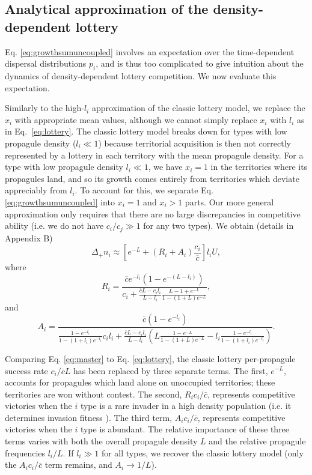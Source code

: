 \documentclass[11pt]{article}
\begin{document}
\subsection*{Analytical approximation of the density-dependent lottery}

Eq. \eqref{eq:growthsumuncoupled} involves an expectation over the time-dependent dispersal distributions $p_i$, and is thus too complicated to give intuition about the dynamics of density-dependent lottery competition. We now evaluate this expectation. 

Similarly to the high-$l_i$ approximation of the classic lottery model, we replace the $x_i$ with appropriate mean values, although we cannot simply replace $x_i$ with $l_i$ as in Eq.~\eqref{eq:lottery}. The classic lottery model breaks down for types with low propagule density ($l_i\ll 1$) because territorial acquisition is then not correctly represented by a lottery in each territory with the mean propagule density. For a type with low propagule density $l_i\ll 1$, we have $x_i=1$ in the territories where its propagules land, and so its growth comes entirely from territories which deviate appreciably from $l_i$. To account for this, we separate Eq. \eqref{eq:growthsumuncoupled} into $x_i=1$ and $x_i>1$ parts. Our more general approximation only requires that there are no large discrepancies in competitive ability (i.e. we do not have $c_i/c_j\gg 1$ for any two types). We obtain (details in Appendix B)
\begin{equation}
\Delta_+ n_i\approx \left[e^{-L}+(R_i+A_i)\frac{c_i}{\overline{c}}\right]l_i U, \label{eq:master}
\end{equation}
where
\begin{equation}
R_i=\frac{\overline{c}e^{-l_i}(1-e^{-(L-l_i)})}{c_i +\frac{\overline{c}L- c_il_i}{L-l_i}\frac{L-1+e^{-L}}{1-(1+L)e^{-L}}},\nonumber \label{eq:Dr}
\end{equation}
and
\begin{equation}
A_i=\frac{\overline{c}(1-e^{-l_i})}{\frac{1-e^{-l_i}}{1-(1+l_i)e^{-l_i}}c_il_i+\frac{\overline{c}L- c_il_i}{L-l_i}\left(L\frac{1-e^{-L}}{1-(1+L)e^{-L}}-l_i\frac{1-e^{-l_i}}{1-(1+l_i)e^{-l_i}}\right)}. \nonumber \label{eq:Da}
\end{equation}

Comparing Eq. \eqref{eq:master} to Eq. \eqref{eq:lottery}, the classic lottery per-propagule success rate $c_i/\overline{c}L$ has been replaced by three separate terms. The first, $e^{-L}$, accounts for propagules which land alone on unoccupied territories; these territories are won without contest. The second, $R_i c_i/\overline{c}$, represents competitive victories when the $i$ type is a rare invader in a high density population (i.e. it determines invasion fitness \citep{metz_1992}). The third term, $A_i c_i/\overline{c}$, represents competitive victories when the $i$ type is abundant. The relative importance of these three terms varies with both the overall propagule density $L$ and the relative propagule frequencies $l_i/L$. If $l_i\gg 1$ for all types, we recover the classic lottery model (only the $A_ic_i/\overline{c}$ term remains, and $A_i\rightarrow 1/L$). 
\end{document}
